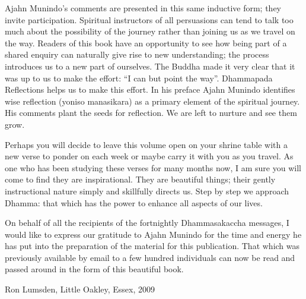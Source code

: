 Ajahn Munindo's comments are presented in this same inductive form; they
invite participation. Spiritual instructors of all persuasions can tend
to talk too much about the possibility of the journey rather than
joining us as we travel on the way. Readers of this book have an
opportunity to see how being part of a shared enquiry can naturally give
rise to new understanding; the process introduces us to a new part of
ourselves. The Buddha made it very clear that it was up to us to make
the effort: ``I can but point the way''. Dhammapada Reflections helps us
to make this effort. In his preface Ajahn Munindo identifies wise
reflection (yoniso manasikara) as a primary element of the spiritual
journey. His comments plant the seeds for reflection. We are left to
nurture and see them grow.

Perhaps you will decide to leave this volume open on your shrine table
with a new verse to ponder on each week or maybe carry it with you as
you travel. As one who has been studying these verses for many months
now, I am sure you will come to find they are inspirational. They are
beautiful things; their gently instructional nature simply and
skillfully directs us. Step by step we approach Dhamma: that which has
the power to enhance all aspects of our lives.

On behalf of all the recipients of the fortnightly Dhammasakaccha
messages, I would like to express our gratitude to Ajahn Munindo for the
time and energy he has put into the preparation of the material for this
publication. That which was previously available by email to a few
hundred individuals can now be read and passed around in the form of
this beautiful book.

{\par\raggedleft
Ron Lumsden, Little Oakley, Essex, 2009
}

